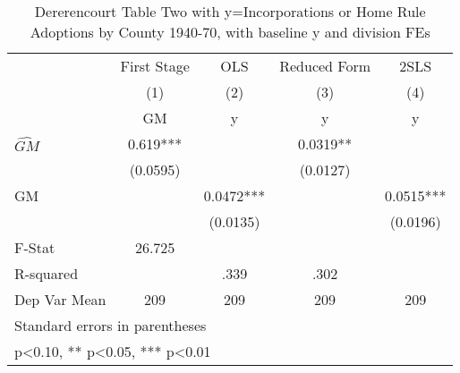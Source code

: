 \begin{table}[htbp]\centering
\def\sym#1{\ifmmode^{#1}\else\(^{#1}\)\fi}
\caption{Dererencourt Table Two with y=Incorporations or Home Rule Adoptions by County 1940-70, with baseline y and division FEs}
\begin{tabular}{l*{4}{c}}
\toprule
                    & First Stage   &         OLS   &Reduced Form   &        2SLS   \\
                    &\multicolumn{1}{c}{(1)}&\multicolumn{1}{c}{(2)}&\multicolumn{1}{c}{(3)}&\multicolumn{1}{c}{(4)}\\
                    &\multicolumn{1}{c}{GM}&\multicolumn{1}{c}{y}&\multicolumn{1}{c}{y}&\multicolumn{1}{c}{y}\\
\midrule
$\hat{GM}$          &       0.619***&               &      0.0319** &               \\
                    &    (0.0595)   &               &    (0.0127)   &               \\
\addlinespace
GM                  &               &      0.0472***&               &      0.0515***\\
                    &               &    (0.0135)   &               &    (0.0196)   \\
\midrule
F-Stat              &      26.725   &               &               &               \\
R-squared           &               &        .339   &        .302   &               \\
Dep Var Mean        &         209   &         209   &         209   &         209   \\
\bottomrule
\multicolumn{5}{l}{\footnotesize Standard errors in parentheses}\\
\multicolumn{5}{l}{\footnotesize * p<0.10, ** p<0.05, *** p<0.01}\\
\end{tabular}
\end{table}
